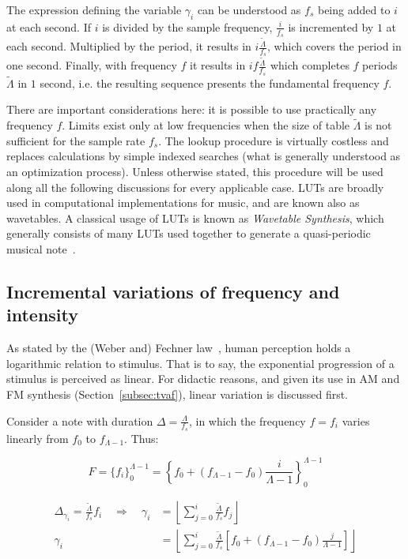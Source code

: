 The expression defining the variable $\gamma_i$ can be understood as $f_s$ being added to $i$ at each second.
If $i$ is divided by the sample frequency, $\frac{i}{f_s}$
is incremented by $1$ at each second. Multiplied by the period, it results in $i \frac{\widetilde{\Lambda}}{f_s}$, which covers the period in one second.
Finally, with frequency $f$ it results in $i f \frac{\widetilde{\Lambda}}{f_s}$ which completes $f$ periods $\widetilde{\Lambda}$ in $1$ second, i.e. the resulting sequence presents the fundamental frequency $f$.

There are important considerations here: it is possible to use practically any frequency $f$.
Limits exist only at low frequencies when the size of table $\widetilde{\Lambda}$ is not sufficient for the sample rate $f_s$.
The lookup procedure is virtually costless and replaces calculations by simple indexed searches 
(what is generally understood as an optimization process).
Unless otherwise stated, this procedure will be used along all the following discussions for every applicable case.
LUTs are broadly used in computational implementations for music,
and are known also as wavetables.
A classical usage of LUTs is known as \emph{Wavetable Synthesis},
which generally consists of many LUTs used together to generate a quasi-periodic musical note~\cite{Cook,Wavetable}.

\subsection{Incremental variations of frequency and intensity}\label{subsec:vars}
As stated by the (Weber and) Fechner law~\cite{Weber-Fechner},
human perception holds a logarithmic relation to stimulus.
That is to say, the exponential progression of a stimulus is perceived as linear.
For didactic reasons, and given its use in AM and FM synthesis (Section~\ref{subsec:tvaf}), linear variation is discussed first.

Consider a note with duration $\Delta = \frac{\Lambda}{f_s}$, in which the frequency $f=f_i$ varies linearly from $f_0$ to $f_{\Lambda -1}$. Thus:

\begin{equation}\label{freqLinear}
 F=\{f_i\}_0^{\Lambda-1}=\left\{f_0 + (f_{\Lambda-1}-f_0)\frac{i}{\Lambda-1} \right\}_0^{\Lambda-1}
\end{equation}

\begin{equation}\label{indiceLinear}
\begin{split}
	\Delta_{\gamma_i}=\frac{\widetilde{\Lambda}}{f_s}f_i \quad \Rightarrow \quad \gamma_i & = \left \lfloor \sum_{j=0}^{i} \frac{\widetilde{\Lambda}}{f_s}f_j \right \rfloor \\
	\gamma_i & =  \left \lfloor \sum_{j=0}^{i} \frac{\widetilde{\Lambda}}{f_s} \left [f_0 + (f_{\Lambda-1}-f_0)\frac{j}{\Lambda-1} \right ] \right \rfloor 
\end{split}
\end{equation}

